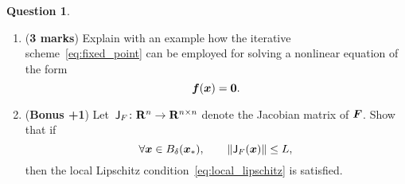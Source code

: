 \documentclass[11pt]{article}
\theoremstyle{definition}
\newtheorem{question}{Question}
\theoremstyle{remark}
\begin{document}
\begin{question}
\begin{enumerate}
        \item
            (\textbf{3 marks})
            Explain with an example how the iterative scheme~\eqref{eq:fixed_point} can be employed for solving a nonlinear equation of the form
            \[
                \mathbf{\boldsymbol{f}}(\mathbf{\boldsymbol{x}}) = \mathbf{\boldsymbol{0}}.
            \]

        \item
            (\textbf{Bonus +1})
            Let~$\mathsf J_F\colon \mathbf R^n \to \mathbf R^{n\times n}$ denote the Jacobian matrix of $\mathbf{\boldsymbol{F}}$.
            Show that if
            \begin{equation*}
                \forall \vect x \in B_{\delta}(\vect x_*), \qquad
                \norm[big]{\mat J_F(\vect x)} \leq L,
            \end{equation*}
            then the local Lipschitz condition~\eqref{eq:local_lipschitz} is satisfied.
    \end{enumerate}
\end{question}
\end{document}
